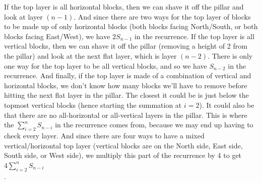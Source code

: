 \documentclass[10pt, AMS Euler]{article}
\begin{document}
    If the top layer is all horizontal blocks, then we can shave it off the pillar and look at layer $(n-1)$. And since there are two ways for the top layer of blocks to be made up of only horizontal blocks (both blocks facing North/South, or both blocks facing East/West), we have $2 S_{n-1}$ in the recurrence. If the top layer is all vertical blocks, then we can shave it off the pillar (removing a height of 2 from the pillar) and look at the next flat layer, which is layer $(n-2)$. There is only one way for the top layer to be all vertical blocks, and so we have $S_{n-2}$ in the recurrence. And finally, if the top layer is made of a combination of vertical and horizontal blocks, we don't know how many blocks we'll have to remove before hitting the next flat layer in the pillar. The closest it could be is just below the topmost vertical blocks (hence starting the summation at $i=2$). It could also be that there are no all-horizontal or all-vertical layers in the pillar. This is where the $\sum_{i = 2}^n S_{n-i}$ in the recurrence comes from, because we may end up having to check every layer. And since there are four ways to have a mixed vertical/horizontal top layer (vertical blocks are on the North side, East side, South side, or West side), we multiply this part of the recurrence by 4 to get $4 \sum_{i = 2}^n S_{n-i}$\\.
    
\end{document}
